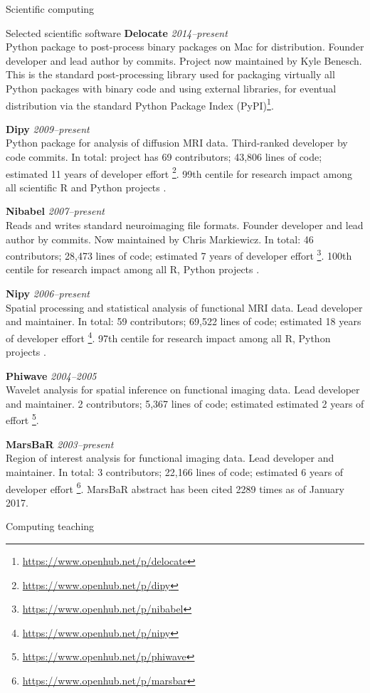 \documentclass{cv}
\newcommand{\PlaceDateNote}[3]{{\bf #1} \hfill {\em #2} \\#3}
\begin{document}
\begin{cvSection}{Scientific computing}
\begin{cvSubSection}{Selected scientific software}
\PlaceDateNote{Delocate}{2014--present}
{Python package to post-process binary packages on Mac for distribution.
    Founder developer and lead author by commits.  Project now maintained by
    Kyle Benesch.  This is the standard post-processing library used for
    packaging virtually all Python packages with binary code and using external
    libraries, for eventual distribution via the standard Python Package Index
    (PyPI)\footnote{\url{https://www.openhub.net/p/delocate}}.}

\PlaceDateNote{Dipy}{2009--present}
{Python package for analysis of diffusion MRI data.  Third-ranked developer by
    code commits.  In total: project has 69 contributors; 43,806 lines of code;
    estimated 11 years of developer effort
    \footnote{\url{https://www.openhub.net/p/dipy}}. 99th centile for research
    impact among all scientific R and Python projects .}

\PlaceDateNote{Nibabel}{2007--present}
{Reads and writes standard neuroimaging file
    formats.  Founder developer and lead author by commits.  Now maintained by
    Chris Markiewicz. In total: 46 contributors; 28,473 lines of code;
    estimated 7 years of developer effort
    \footnote{\url{https://www.openhub.net/p/nibabel}}.  100th centile for
    research impact among all R, Python projects .}

\PlaceDateNote{Nipy}{2006--present}
{Spatial processing and statistical analysis
of functional MRI data.  Lead developer and maintainer.  In total: 59
contributors; 69,522 lines of code; estimated 18 years of developer effort
\footnote{\url{https://www.openhub.net/p/nipy}}.  97th centile for research
impact among all R, Python projects \footref{depsy}.}

\PlaceDateNote{Phiwave}{2004--2005}
{Wavelet analysis for spatial inference on
functional imaging data.  Lead developer and maintainer.  2 contributors;
5,367 lines of code; estimated estimated 2 years of effort
\footnote{\url{https://www.openhub.net/p/phiwave}}.}

\PlaceDateNote{MarsBaR}{2003--present}
{Region of interest analysis for functional
    imaging data.  Lead developer and maintainer.  In total: 3 contributors;
22,166 lines of code; estimated 6 years of developer effort
\footnote{\url{https://www.openhub.net/p/marsbar}}.  MarsBaR abstract has been
cited 2289 times as of January 2017.}

\end{cvSubSection}

\begin{cvSubSection}{Computing teaching}


\end{cvSubSection}
\end{cvSection}
\end{document}
